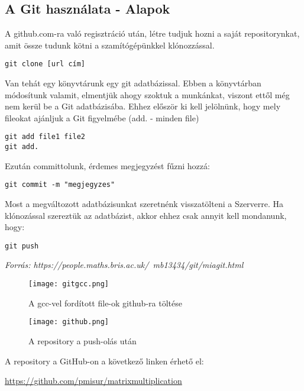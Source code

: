 \documentclass[a4paper, 12pt]{article}
\begin{document}
\subsection{A Git használata - Alapok}
A github.com-ra való regisztráció után, létre tudjuk hozni a saját repositorynkat, amit össze tudunk kötni a szamítógépünkkel klónozzással.

\begin{verbatim}
git clone [url cím]
\end{verbatim}
Van tehát egy könyvtárunk egy git adatbázissal. Ebben a könyvtárban módosítunk valamit, elmentjük ahogy szoktuk a munkánkat, viszont ettől még nem kerül be a Git adatbázisába. Ehhez először ki kell jelölnünk, hogy mely fileokat ajánljuk a Git figyelmébe (add. - minden file)

\begin{verbatim}
git add file1 file2
git add.
\end{verbatim}
Ezután committolunk, érdemes megjegyzést fűzni hozzá:

\begin{verbatim}
git commit -m "megjegyzes"
\end{verbatim}
Most a megváltozott adatbázisunkat szeretnénk visszatölteni a Szerverre. Ha klónozással szereztük az adatbázist, akkor ehhez csak annyit kell mondanunk, hogy:

\begin{verbatim}
git push
\end{verbatim}
\textit{Forrás: https://people.maths.bris.ac.uk/~mb13434/git/miagit.html}

\begin{figure}[h!]
\begin{center}
\texttt{[image: gitgcc.png]}
\caption*{A gcc-vel fordított file-ok github-ra töltése}
\end{center}
\end{figure}

\begin{figure}[h!]
\begin{center}
\texttt{[image: github.png]}
\caption*{A repository a push-olás után}
\end{center}
\end{figure}

A repository a GitHub-on a következő linken érhető el:
\begin{center}
\href{url}{https://github.com/pmisur/matrixmultiplication}
\end{center}
\end{document}
